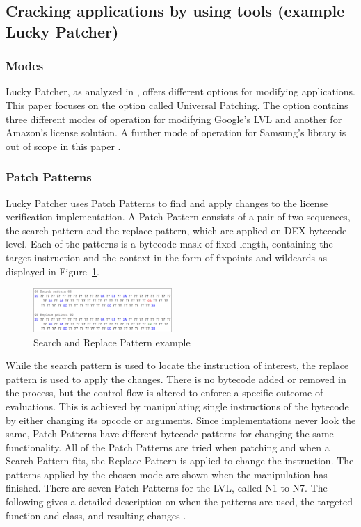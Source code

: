 \documentclass{sig-alternate}
\begin{document}
\subsection{Cracking applications by using tools (example Lucky Patcher)}
\subsubsection{Modes}
Lucky Patcher, as analyzed in \cite{neutze}, offers different options for modifying applications. This paper focuses on the option called Universal Patching. The option contains three different modes of operation for modifying Google's LVL and another for Amazon's license solution. A further mode of operation for Samsung's library is out of scope in this paper \cite{neutze}.
\subsubsection{Patch Patterns}
Lucky Patcher uses Patch Patterns to find and apply changes to the license verification implementation. A Patch Pattern consists of a pair of two sequences, the search pattern and the replace pattern, which are applied on DEX bytecode level. Each of the patterns is a bytecode mask of fixed length, containing the target instruction and the context in the form of fixpoints and wildcards as displayed in Figure~\ref{n0}.
\begin{figure}[htbp]
  \centering
  \includegraphics[width=0.47\textwidth]{n0.png}
  \caption{Search and Replace Pattern example \cite{neutze}}
  \label{n0}
\end{figure}
While the search pattern is used to locate the instruction of interest, the replace pattern is used to apply the changes. There is no bytecode added or removed in the process, but the control flow is altered to enforce a specific outcome of evaluations. This is achieved by manipulating single instructions of the bytecode by either changing its opcode or arguments. Since implementations never look the same, Patch Patterns have different bytecode patterns for changing the same functionality. All of the Patch Patterns are tried when patching and when a Search Pattern fits, the Replace Pattern is applied to change the instruction. The patterns applied by the chosen mode are shown when the manipulation has finished. There are seven Patch Patterns for the LVL, called N1 to N7. The following gives a detailed description on when the patterns are used, the targeted function and class, and resulting changes \cite{neutze}.\\
\end{document}
